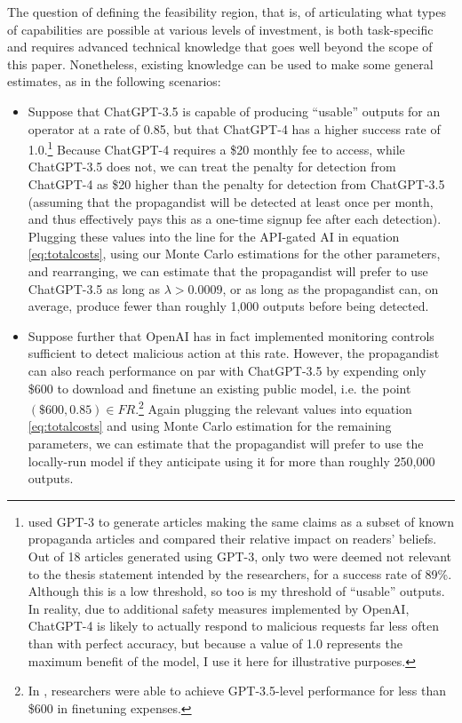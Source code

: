 \documentclass{article}
\begin{document}
The question of defining the feasibility region, that is, of articulating what types of capabilities are possible at various levels of investment, is both task-specific and requires advanced technical knowledge that goes well beyond the scope of this paper. Nonetheless, existing knowledge can be used to make some general estimates, as in the following scenarios:

\begin{itemize}
  \item Suppose that ChatGPT-3.5 is capable of producing ``usable'' outputs for an operator at a rate of 0.85, but that ChatGPT-4 has a higher success rate of 1.0.\footnote{\cite{surveyresearch} used GPT-3 to generate articles making the same claims as a subset of known propaganda articles and compared their relative impact on readers' beliefs. Out of 18 articles generated using GPT-3, only two were deemed not relevant to the thesis statement intended by the researchers, for a success rate of 89\%. Although this is a low threshold, so too is my threshold of ``usable'' outputs. In reality, due to additional safety measures implemented by OpenAI, ChatGPT-4 is likely to actually respond to malicious requests far less often than with perfect accuracy, but because a value of 1.0 represents the maximum benefit of the model, I use it here for illustrative purposes.} Because ChatGPT-4 requires a \$20 monthly fee to access, while ChatGPT-3.5 does not, we can treat the penalty for detection from ChatGPT-4 as \$20 higher than the penalty for detection from ChatGPT-3.5 (assuming that the propagandist will be detected at least once per month, and thus effectively pays this as a one-time signup fee after each detection). Plugging these values into the line for the API-gated AI in equation \ref{eq:totalcosts}, using our Monte Carlo estimations for the other parameters, and rearranging, we can estimate that the propagandist will prefer to use ChatGPT-3.5 as long as $\lambda > 0.0009$, or as long as the propagandist can, on average, produce fewer than roughly 1,000 outputs before being detected. 
  \item Suppose further that OpenAI has in fact implemented monitoring controls sufficient to detect malicious action at this rate. However, the propagandist can also reach performance on par with ChatGPT-3.5 by expending only \$600 to download and finetune an existing public model, i.e. the point $(\$600, 0.85) \in FR$.\footnote{In \cite{alpaca}, researchers were able to achieve GPT-3.5-level performance for less than \$600 in finetuning expenses.} Again plugging the relevant values into equation \ref{eq:totalcosts} and using Monte Carlo estimation for the remaining parameters, we can estimate that the propagandist will prefer to use the locally-run model if they anticipate using it for more than roughly 250,000 outputs. 

\end{itemize}
\end{document}
